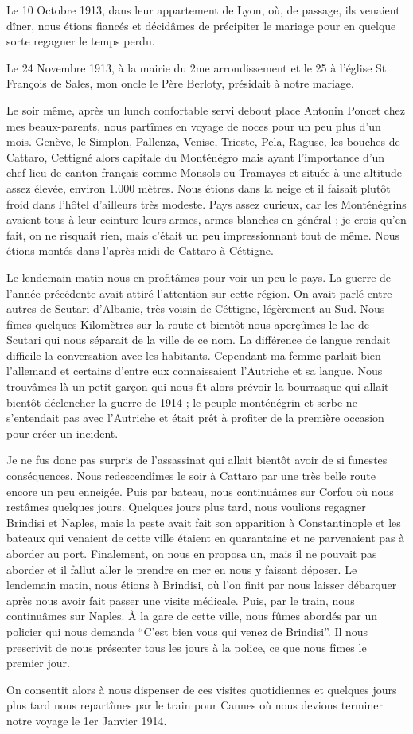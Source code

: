 \documentclass[11pt,a4paper]{report}
\begin{document}
Le 10 Octobre 1913, dans leur appartement de Lyon, où, de passage, ils venaient dîner, nous étions fiancés et décidâmes de précipiter le mariage pour en quelque sorte regagner le temps perdu.

Le 24 Novembre 1913, à la mairie du 2me arrondissement et le 25 à l'église St François de Sales, mon oncle le Père Berloty, présidait à notre mariage.

Le soir même, après un lunch confortable servi debout place Antonin Poncet chez mes beaux-parents, nous partîmes en voyage de noces pour un peu plus d'un mois. Genève, le Simplon, Pallenza, Venise, Trieste, Pela, Raguse, les bouches de Cattaro, Cettigné alors capitale du Monténégro mais ayant l'importance d'un chef-lieu de canton français comme Monsols ou Tramayes et située à une altitude assez élevée, environ 1.000 mètres. Nous étions dans la neige et il faisait plutôt froid dans l'hôtel d'ailleurs très modeste. Pays assez curieux, car les Monténégrins avaient tous à leur ceinture leurs armes, armes blanches en général ; je crois qu'en fait, on ne risquait rien, mais c'était un peu impressionnant tout de même. Nous étions montés dans l'après-midi de Cattaro à Céttigne.

Le lendemain matin nous en profitâmes pour voir un peu le pays. La guerre de l'année précédente avait attiré l'attention sur cette région. On avait parlé entre autres de Scutari d'Albanie, très voisin de Céttigne, légèrement au Sud. Nous fîmes quelques Kilomètres sur la route et bientôt nous aperçûmes le lac de Scutari qui nous séparait de la ville de ce nom. La différence de langue rendait difficile la conversation avec les habitants. Cependant ma femme parlait bien l'allemand et certains d'entre eux connaissaient l'Autriche et sa langue. Nous trouvâmes là un petit garçon qui nous fit alors prévoir la bourrasque qui allait bientôt déclencher la guerre de 1914 ; le peuple monténégrin et serbe ne s'entendait pas avec l'Autriche et était prêt à profiter de la première occasion pour créer un incident.

Je ne fus donc pas surpris de l'assassinat qui allait bientôt avoir de si funestes conséquences. Nous redescendîmes le soir à Cattaro par une très belle route encore un peu enneigée. Puis par bateau, nous continuâmes sur Corfou où nous restâmes quelques jours. Quelques jours plus tard, nous voulions regagner Brindisi et Naples, mais la peste avait fait son apparition à Constantinople et les bateaux qui venaient de cette ville étaient en quarantaine et ne parvenaient pas à aborder au port. Finalement, on nous en proposa un, mais il ne pouvait pas aborder et il fallut aller le prendre en mer en nous y faisant déposer. Le lendemain matin, nous étions à Brindisi, où l'on finit par nous laisser débarquer après nous avoir fait passer une visite médicale. Puis, par le train, nous continuâmes sur Naples. À la gare de cette ville, nous fûmes abordés par un policier qui nous demanda ``C'est bien vous qui venez de Brindisi''. Il nous prescrivit de nous présenter tous les jours à la police, ce que nous fîmes le premier jour.

On consentit alors à nous dispenser de ces visites quotidiennes et quelques jours plus tard nous repartîmes par le train pour Cannes où nous devions terminer notre voyage le 1er Janvier 1914.
\end{document}
